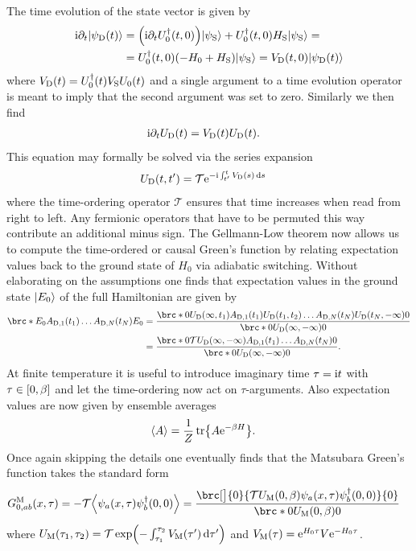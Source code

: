 \documentclass[english, parskip=full]{scrartcl}
\begin{document}
The time evolution of the state vector is given by
\begin{align}
\i\partial_t\Ket{\psi_\Text{D}(t)} &= \kla*{\i\partial_t U_0^\dagger(t,0)} \Ket{\psi_\Text{S}} + U_0^\dagger(t,0) H_\Text{S}\Ket{\psi_\Text{S}} = \\
&= U_0^\dagger(t,0) \kla*{-H_0 + H_\Text{S}} \Ket{\psi_\Text{S}} = V_\Text{D}(t,0) \Ket{\psi_\Text{D}(t)}
\end{align}
where $V_\Text{D}(t) = U_0^\dagger(t) V_\Text{S} U_0(t)$ and a single argument to a time evolution operator is meant to imply that the second argument was set to zero.
Similarly we then find
\begin{align}
\i\partial_t U_\Text{D}(t) &= V_\Text{D}(t) U_\Text{D}(t).
\end{align}
This equation may formally be solved via the series expansion
\begin{align}
U_\Text{D}(t,t') &= \mathcal{T} \powe{-\i\intx{t'}{t}{V_\Text{D}(s)}{s}}
\end{align}
where the time-ordering operator $\mathcal{T}$ ensures that time increases when read from right to left.
Any fermionic operators that have to be permuted this way contribute an additional minus sign.
The Gellmann-Low theorem now allows us to compute the time-ordered or causal Green's function by relating expectation values back to the ground state of $H_0$ via adiabatic switching.
Without elaborating on the assumptions one finds that expectation values in the ground state $\Ket{E_0}$ of the full Hamiltonian are given by
\begin{align}
\brc*{E_0}{A_{\Text{D},1}(t_1) \dots A_{\Text{D},N}(t_N)}{E_0} &= \frac{\brc*{0}{U_\Text{D}(\infty,t_1) A_{\Text{D},1}(t_1) U_\Text{D}(t_1,t_2) \dots A_{\Text{D},N}(t_N) U_{\Text{D}}(t_N,-\infty) }{0}}{\brc*{0}{U_\Text{D}(\infty,-\infty)}{0}}\\
&= \frac{\brc*{0}{\mathcal{T} U_\Text{D}(\infty,-\infty) A_{\Text{D},1}(t_1)\dots A_{\Text{D},N}(t_N)}{0}}{\brc*{0}{U_\Text{D}(\infty,-\infty)}{0}}.
\end{align}
At finite temperature it is useful to introduce imaginary time $\tau=\i t$ with $\tau\in\klb*{0,\beta}$ and let the time-ordering now act on $\tau$-arguments.
Also expectation values are now given by ensemble averages
\begin{align}
\bra*{A} &= \frac{1}{Z} \tr \klc*{A\powe{-\beta H}}.
\end{align}
Once again skipping the details one eventually finds that the Matsubara Green's function takes the standard form
\begin{align}
G_{0,ab}^\M(x,\tau) &= -\mathcal{T} \bra*{\psi_a(x,\tau) \psi_b^\dagger(0,0)} = \frac{\brc[\big]{0}{\mathcal{T} U_\Text{M}(0,\beta) \psi_a(x,\tau) \psi_b^\dagger(0,0)}{0}}{\brc*{0}{U_\Text{M}(0,\beta)}{0}}
\end{align}
where $U_\M(\tau_1,\tau_2) = \mathcal{T} \exp\kla*{-\intx{\tau_1}{\tau_2}{V_\M(\tau')}{\tau'}}$ and $V_\M(\tau) = \powe{H_0\tau} V \powe{-H_0\tau}$.
\end{document}
